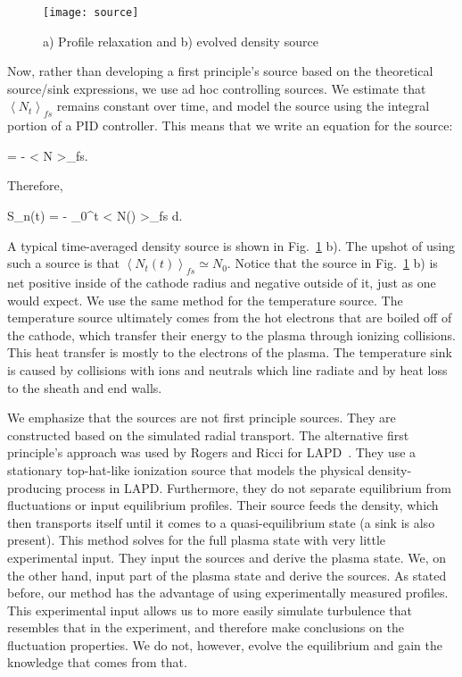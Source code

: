\begin{figure}[!ht]
\centerline{\texttt{[image: source]}}
\caption{a) Profile relaxation and b) evolved density source}
\label{source}
\end{figure}


Now, rather than developing a first principle's source based on the theoretical source/sink expressions, we use ad hoc controlling sources. 
We estimate that $\left< N_t \right>_{fs}$ remains constant over time, and model the source using the integral
portion of a PID controller. This means that we write an equation for the source:

\beq
\label{Sn_eq}
 = - \left< N \right>_{fs}.
\eeq

Therefore,

\beq
\label{Sn_eq2}
S_n(t) = - \int_0^t \left< N(\tau) \right>_{fs} d\tau.
\eeq

A typical time-averaged density source is shown in Fig.~\ref{source} b).
The upshot of using such a source is that $\left< N_t(t) \right>_{fs} \simeq N_0$. Notice that the source in Fig.~\ref{source} b) is net positive inside of the cathode radius and negative
outside of it, just as one would expect.
We use the same method for the temperature source. The temperature source ultimately comes from the hot electrons that are boiled off of
the cathode, which transfer their energy to the plasma through ionizing collisions. This heat transfer is mostly to the electrons of the plasma. The temperature sink is caused by collisions
with ions and neutrals which line radiate and by heat loss to the sheath and end walls.

We emphasize that the sources are not first principle sources. They are constructed based on the simulated radial transport. The alternative first principle's approach was used by Rogers and Ricci
for LAPD~\cite{rogers2010}. They use a stationary top-hat-like ionization source that models the physical density-producing process in LAPD. 
Furthermore, they do not separate equilibrium from fluctuations or input equilibrium profiles. Their source feeds the density, which then transports itself until it comes to a quasi-equilibrium state
(a sink is also present). This method solves for the full plasma state with very little experimental input. 
They input the sources and derive the plasma state. We, on the other hand, input part of the plasma
state and derive the sources. As stated before, our method has the advantage of using experimentally measured profiles. 
This experimental input allows us to more easily simulate turbulence that resembles that
in the experiment, and therefore make conclusions on the fluctuation properties. We do not, however, evolve the equilibrium and gain the knowledge that comes from that.

